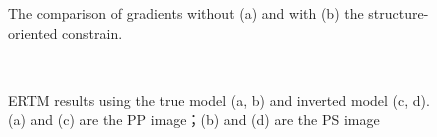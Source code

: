 \documentclass[extra,mreferee]{gji}
\begin{document}
\clearpage
\begin{figure}
   \centering
   \caption{The comparison of gradients without (a) and   with (b) 
   the structure-oriented constrain. }
   \label{fig:LSF_comparison}
\end{figure}
\clearpage
\begin{figure}
   \centering
   \\
   \caption{ERTM results using the true model (a, b) and
   inverted model (c, d). (a) and (c) are the PP image；(b) and (d) are the PS
   image}
   \label{fig:ERTM_comparison}
\end{figure}
\end{document}
